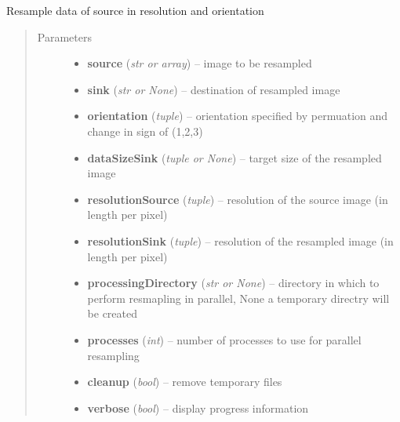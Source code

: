 \documentclass[letterpaper,10pt,english]{sphinxmanual}
\begin{document}
\begin{fulllineitems}
\label{api/ClearMap.Alignment:ClearMap.Alignment.Resampling.resampleData}
Resample data of source in resolution and orientation
\begin{quote}\begin{description}
\item[{Parameters}] \leavevmode\begin{itemize}
\item {} 
\textbf{source} (\emph{str or array}) --
image to be resampled

\item {} 
\textbf{sink} (\emph{str or None}) --
destination of resampled image

\item {} 
\textbf{orientation} (\emph{tuple}) --
orientation specified by permuation and change in sign of (1,2,3)

\item {} 
\textbf{dataSizeSink} (\emph{tuple or None}) --
target size of the resampled image

\item {} 
\textbf{resolutionSource} (\emph{tuple}) --
resolution of the source image (in length per pixel)

\item {} 
\textbf{resolutionSink} (\emph{tuple}) --
resolution of the resampled image (in length per pixel)

\item {} 
\textbf{processingDirectory} (\emph{str or None}) --
directory in which to perform resmapling in parallel, None a temporary directry will be created

\item {} 
\textbf{processes} (\emph{int}) --
number of processes to use for parallel resampling

\item {} 
\textbf{cleanup} (\emph{bool}) --
remove temporary files

\item {} 
\textbf{verbose} (\emph{bool}) --
display progress information


\end{itemize}
\end{description}
\end{quote}
\end{fulllineitems}
\end{document}
